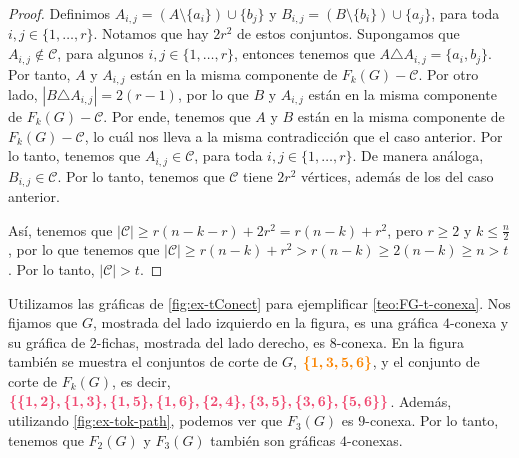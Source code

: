 \begin{proof}
Definimos $A_{i,j} = (A\setminus \{a_i\}) \cup \{b_j\}$ y $B_{i,j} = (B\setminus
\{b_i\}) \cup \{a_j\}$, para toda $ i, j \in \{1, \dots, r\}$. Notamos que hay
$2r^2$ de estos conjuntos. Supongamos que $A_{i,j} \notin \mathcal{C}$, para
algunos $ i, j \in \{1, \dots, r\}$, entonces tenemos que $A \triangle A_{i,j} =
\{a_i, b_j\}$. Por tanto, $A$ y $A_{i,j}$ est\'an en la misma componente de
$F_k(G)- \mathcal{C}$. Por otro lado, $|B \triangle A_{i,j}| = 2 (r-1)$, por lo
que $B$ y $A_{i,j}$ est\'an en la misma componente de $F_k(G) - \mathcal{C}$.
Por ende, tenemos que $A$ y $B$ est\'an en la misma componente de
$F_k(G)-\mathcal{C}$, lo cu\'al nos lleva a la misma contradicci\'on que el caso
anterior. Por lo tanto, tenemos que $A_{i,j} \in \mathcal{C}$, para toda $i, j
\in \{1, \dots, r\}$. De manera an\'aloga, $B_{i,j} \in \mathcal{C}$. Por lo
tanto, tenemos que $\mathcal{C}$ tiene $2r^2$ v\'ertices, adem\'as de los del
caso anterior.

As\'i, tenemos que $|\mathcal{C}|\geq r(n-k-r)+2r^2 = r(n-k) + r^2$, pero $r
\geq 2$ y $k \leq \frac{n}{2}$, por lo que tenemos que $|\mathcal{C}| \geq
r(n-k)+r^2 > r(n-k) \geq 2(n-k) \geq n >t$. Por lo tanto, $|\mathcal{C}|>t$.
\end{proof} 

Utilizamos las gr\'aficas de \cref{fig:ex-tConect} para ejemplificar
\cref{teo:FG-t-conexa}. Nos fijamos que $G$, mostrada del lado izquierdo en la
figura, es una gr\'afica $4$-conexa y su gr\'afica de $2$-fichas, mostrada del
lado derecho, es $8$-conexa. En la figura tambi\'en se muestra el conjuntos de
corte de $G$, ${\color{naranja}\boldsymbol{ \{1,3,5,6\}}}$, y el conjunto de
corte de $F_k(G)$, es decir, ${\color{fushia}\boldsymbol
{\{\{1,2\},\{1,3\},\{1,5\},\{1,6\},\{2,4\},\{3,5\},\{3,6\},\{5,6\}\}}}$.
Adem\'as, utilizando \cref{fig:ex-tok-path}, podemos ver que $F_3(G)$ es
$9$-conexa. Por lo tanto, tenemos que $F_2(G)$ y $F_3(G)$ tambi\'en son
gr\'aficas $4$-conexas.

